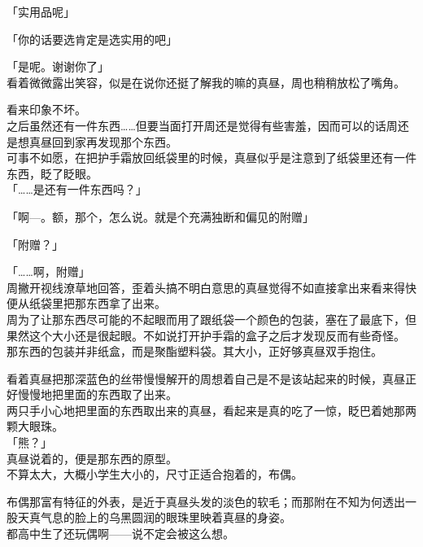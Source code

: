 「实用品呢」

「你的话要选肯定是选实用的吧」

「是呢。谢谢你了」\\

看着微微露出笑容，似是在说你还挺了解我的嘛的真昼，周也稍稍放松了嘴角。

看来印象不坏。\\

之后虽然还有一件东西……但要当面打开周还是觉得有些害羞，因而可以的话周还是想真昼回到家再发现那个东西。\\

可事不如愿，在把护手霜放回纸袋里的时候，真昼似乎是注意到了纸袋里还有一件东西，眨了眨眼。\\

「……是还有一件东西吗？」

「啊—。额，那个，怎么说。就是个充满独断和偏见的附赠」

「附赠？」

「……啊，附赠」\\

周撇开视线潦草地回答，歪着头搞不明白意思的真昼觉得不如直接拿出来看来得快便从纸袋里把那东西拿了出来。\\

周为了让那东西尽可能的不起眼而用了跟纸袋一个颜色的包装，塞在了最底下，但果然这个大小还是很起眼。不如说打开护手霜的盒子之后才发现反而有些奇怪。\\

那东西的包装并非纸盒，而是聚酯塑料袋。其大小，正好够真昼双手抱住。

看着真昼把那深蓝色的丝带慢慢解开的周想着自己是不是该站起来的时候，真昼正好慢慢地把里面的东西取了出来。\\

两只手小心地把里面的东西取出来的真昼，看起来是真的吃了一惊，眨巴着她那两颗大眼珠。\\

「熊？」\\

真昼说着的，便是那东西的原型。\\

不算太大，大概小学生大小的，尺寸正适合抱着的，布偶。

布偶那富有特征的外表，是近于真昼头发的淡色的软毛；而那附在不知为何透出一股天真气息的脸上的乌黑圆润的眼珠里映着真昼的身姿。\\

都高中生了还玩偶啊——说不定会被这么想。\\

